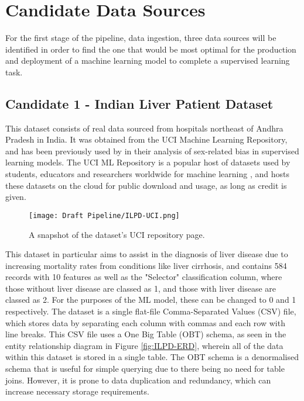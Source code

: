 \chapter{Candidate Data Sources}
For the first stage of the pipeline, data ingestion, three data sources will be identified in order to find 
the one that would be most optimal for the production and deployment of a machine learning model to complete 
a supervised learning task.

\section{Candidate 1 - Indian Liver Patient Dataset}
This dataset \autocite{bendi_ramana_ilpd_2022} consists of real data sourced from hospitals northeast of Andhra Pradesh in India. It was obtained from the
UCI Machine Learning Repository, and has been previously used by \textcite{straw_investigating_2022} in their analysis of sex-related bias in supervised learning models. The UCI ML Repository is a popular host of datasets used by students, 
educators and researchers worldwide for machine learning \autocite{uci_machine_learning_repository_about_nodate}, and hosts these datasets 
on the cloud for public download and usage, as long as credit is given.

\begin{figure}[H]
    \centering
    \texttt{[image: Draft Pipeline/ILPD-UCI.png]}
    \caption{A snapshot of the dataset's UCI repository page.}
    \label{fig:ILPD-UCI}
\end{figure}

This dataset in particular aims to assist in the diagnosis of liver
disease due to increasing mortality rates from conditions like liver cirrhosis, and contains 584 records with 10 features
as well as the "Selector" classification column, where those without liver disease are classed as 1, and those with liver disease 
are classed as 2. For the purposes of the ML model, these can be changed to 0 and 1 respectively. 
The dataset is a single flat-file Comma-Separated Values (CSV) file, which stores data by separating each column with commas
and each row with line breaks. This CSV file uses a One Big Table (OBT) schema, as seen in the entity relationship diagram 
in Figure \ref{fig:ILPD-ERD}, wherein all of the data within this dataset is stored in a single table. 
The OBT schema is a denormalised schema that is useful for simple querying due to there being no need for table joins. 
However, it is prone to data duplication and redundancy, which can increase necessary storage requirements.

